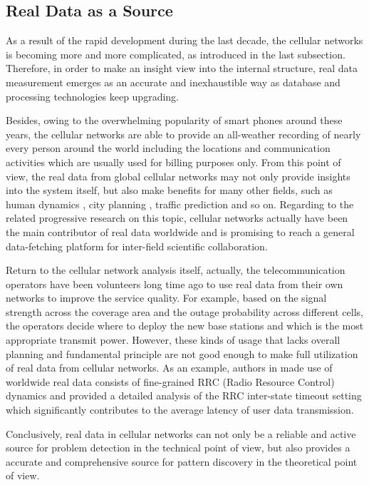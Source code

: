 \subsection{Real Data as a Source}
As a result of the rapid development during the last decade, the cellular networks is becoming more and more complicated, as introduced in the last subsection. Therefore, in order to make an insight view into the internal structure, real data measurement emerges as an accurate and inexhaustible way as database and processing technologies keep upgrading.

Besides, owing to the overwhelming popularity of smart phones around these years, the cellular networks are able to provide an all-weather recording of nearly every person around the world including the locations and communication activities \cite{calabrese2011real} which are usually used for billing purposes only. From this point of view, the real data from global cellular networks may not only provide insights into the system itself, but also make benefits for many other fields, such as human dynamics \cite{song2010limits} \cite{trasarti2015discovering}, city planning \cite{ratti2006mobile}, traffic prediction \cite{calabrese2011real} and so on. Regarding to the related progressive research on this topic, cellular networks actually have been the main contributor of real data worldwide and is promising to reach a general data-fetching platform for inter-field scientific collaboration.

Return to the cellular network analysis itself, actually, the telecommunication operators have been volunteers long time ago to use real data from their own networks to improve the service quality. For example, based on the signal strength across the coverage area and the outage probability across different cells, the operators decide where to deploy the new base stations and which is the most appropriate transmit power. However, these kinds of usage that lacks overall planning and fundamental principle are not good enough to make full utilization of real data from cellular networks. As an example, authors in \cite{rosen2014discovering} made use of worldwide real data consists of fine-grained RRC (Radio Resource Control) dynamics and provided a detailed analysis of the RRC inter-state timeout setting which significantly contributes to the average latency of user data transmission.

Conclusively, real data in cellular networks can not only be a reliable and active source for problem detection in the technical point of view, but also provides a accurate and comprehensive source for pattern discovery in the theoretical point of view.

